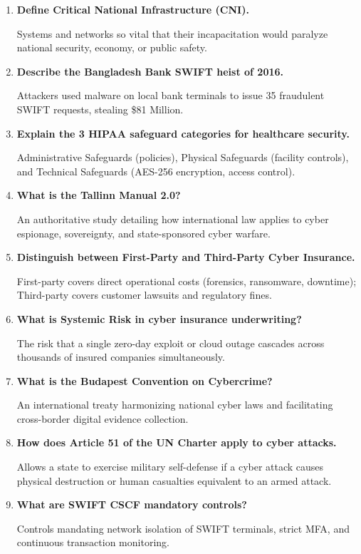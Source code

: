 \documentclass[12pt,a4paper]{article}
\newcommand{\Q}[1]{\textbf{#1}\par\noindent\ignorespaces}
\begin{document}
\begin{tcolorbox}[exambox, title={\textbf{Frequently Asked / Viva Questions}}]
\begin{enumerate}[leftmargin=*, label=\textbf{Q\arabic*.}, itemsep=5pt, topsep=0pt]
  \item \Q{Define Critical National Infrastructure (CNI).}
        Systems and networks so vital that their incapacitation would paralyze national security, economy, or public safety.

  \item \Q{Describe the Bangladesh Bank SWIFT heist of 2016.}
        Attackers used malware on local bank terminals to issue 35 fraudulent SWIFT requests, stealing \$81 Million.

  \item \Q{Explain the 3 HIPAA safeguard categories for healthcare security.}
        Administrative Safeguards (policies), Physical Safeguards (facility controls), and Technical Safeguards (AES-256 encryption, access control).

  \item \Q{What is the Tallinn Manual 2.0?}
        An authoritative study detailing how international law applies to cyber espionage, sovereignty, and state-sponsored cyber warfare.

  \item \Q{Distinguish between First-Party and Third-Party Cyber Insurance.}
        First-party covers direct operational costs (forensics, ransomware, downtime); Third-party covers customer lawsuits and regulatory fines.

  \item \Q{What is Systemic Risk in cyber insurance underwriting?}
        The risk that a single zero-day exploit or cloud outage cascades across thousands of insured companies simultaneously.

  \item \Q{What is the Budapest Convention on Cybercrime?}
        An international treaty harmonizing national cyber laws and facilitating cross-border digital evidence collection.

  \item \Q{How does Article 51 of the UN Charter apply to cyber attacks.}
        Allows a state to exercise military self-defense if a cyber attack causes physical destruction or human casualties equivalent to an armed attack.

  \item \Q{What are SWIFT CSCF mandatory controls?}
        Controls mandating network isolation of SWIFT terminals, strict MFA, and continuous transaction monitoring.


\end{enumerate}
\end{tcolorbox}
\end{document}
